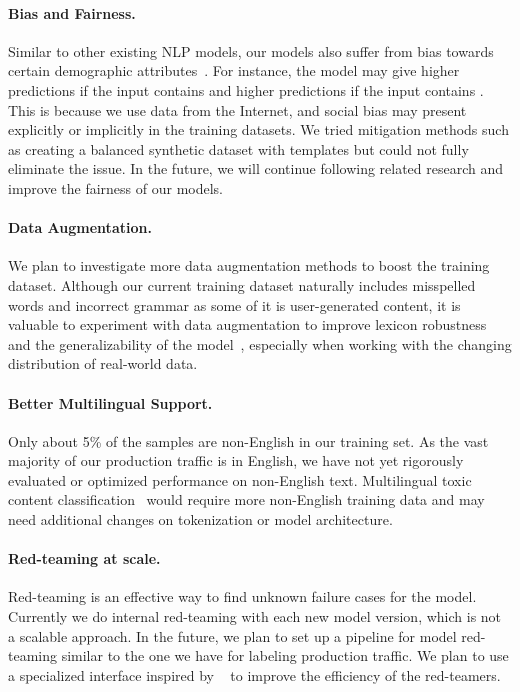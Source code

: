\documentclass[letterpaper]{article} %
\begin{document}
\paragraph{Bias and Fairness.} Similar to other existing NLP models, our models also suffer from bias towards certain demographic attributes~\citep{Kusner2017Counterfactual, Garg2019Counterfactual, Dwork2012Fairness}. For instance, the model may give higher  predictions if the input contains  and higher  predictions if the input contains . This is because we use data from the Internet, and social bias may present explicitly or implicitly in the training datasets. We tried mitigation methods such as creating a balanced synthetic dataset with templates but could not fully eliminate the issue. In the future, we will continue following related research and improve the fairness of our models.

\paragraph{Data Augmentation.} We plan to investigate more data augmentation methods to boost the training dataset. Although our current training dataset naturally includes misspelled words and incorrect grammar as some of it is user-generated content, it is valuable to experiment with data augmentation to improve lexicon robustness~\cite{wei2019eda,kobayashi2018contextual,zhang2021double} and the generalizability of the model~\cite{guo2019augmenting,shen2020cutoff,gao2021simcse}, especially when working with the changing distribution of real-world data. 

\paragraph{Better Multilingual Support.} Only about 5\% of the samples are non-English in our training set. As the vast majority of our production traffic is in English, we have not yet rigorously evaluated or optimized performance on non-English text. Multilingual toxic content classification~\cite{aluru2020deep,wang2021multilingual,lees2022perspective} would require more non-English training data and may need additional changes on tokenization or model architecture.

\paragraph{Red-teaming at scale.} Red-teaming is an effective way to find unknown failure cases for the model. Currently we do internal red-teaming with each new model version, which is not a scalable approach. In the future, we plan to set up a pipeline for model red-teaming similar to the one we have for labeling production traffic. We plan to use a specialized interface inspired by ~\citet{kiela2021dynabench,ziegler2022adv} to improve the efficiency of the red-teamers.
\end{document}
